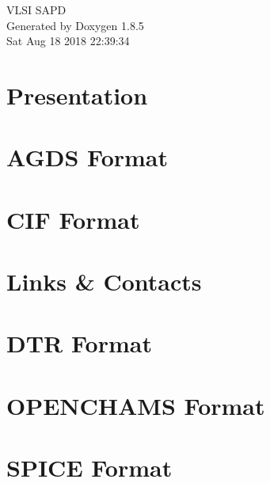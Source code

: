 \documentclass[twoside]{book}
\newcommand{\clearemptydoublepage}{%
  \newpage{\pagestyle{empty}\cleardoublepage}%
}
\begin{document}
\hypersetup{pageanchor=false}
\begin{titlepage}
\vspace*{7cm}
\begin{center}%
{\Large V\-L\-S\-I S\-A\-P\-D }\\
\vspace*{1cm}
{\large Generated by Doxygen 1.8.5}\\
\vspace*{0.5cm}
{\small Sat Aug 18 2018 22:39:34}\\
\end{center}
\end{titlepage}
\clearemptydoublepage
\tableofcontents
\clearemptydoublepage
{}
\hypersetup{pageanchor=true}

\chapter{Presentation}
\label{index}\hypertarget{index}{}
\chapter{A\-G\-D\-S Format}
\label{agds}
\hypertarget{agds}{}

\chapter{C\-I\-F Format}
\label{cif}
\hypertarget{cif}{}

\chapter{Links \& Contacts}
\label{contact}
\hypertarget{contact}{}

\chapter{D\-T\-R Format}
\label{dtr}
\hypertarget{dtr}{}

\chapter{O\-P\-E\-N\-C\-H\-A\-M\-S Format}
\label{openchams}
\hypertarget{openchams}{}

\chapter{S\-P\-I\-C\-E Format}
\label{spice}
\hypertarget{spice}{}

\end{document}

